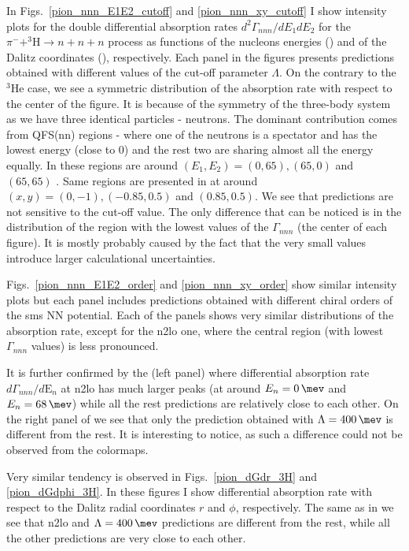     In Figs.~\ref{pion_nnn_E1E2_cutoff} and \ref{pion_nnn_xy_cutoff} I show intensity plots for the double differential absorption rates
    $d^2 \Gamma_{nnn}/dE_1dE_2$ for the $\pi^- + ^3\text{H} \rightarrow n + n + n$ process as functions of the nucleons energies
    () and of the Dalitz coordinates (), respectively.
    Each panel in the figures presents predictions obtained with different values of the cut-off parameter $\Lambda$.
    On the contrary to the $^3$He case, we see a symmetric distribution of the absorption rate with respect to the
    center of the figure. It is because of the symmetry of the three-body system as we have three identical particles - neutrons.
    The dominant contribution comes from QFS(nn) regions - where one of the neutrons is a spectator and has the lowest energy (close to 0)
    and the rest two are sharing almost all the energy equally.
    In  these regions are around $(E_1, E_2) = (0, 65), (65, 0)$ and $(65, 65)$ \SI{}{\mev}.
    Same regions are presented in  at around $(x, y) = (0, -1), (-0.85, 0.5)$ and $(0.85, 0.5)$.
    We see that predictions are not sensitive to the cut-off value.
    The only difference that can be noticed is in the distribution of the region with the lowest values of 
    the $\Gamma_{nnn}$ (the center of each figure). It is mostly probably caused by the fact that
    the very small values introduce larger calculational uncertainties.


    Figs.~\ref{pion_nnn_E1E2_order} and \ref{pion_nnn_xy_order} show similar intensity plots but each panel includes
    predictions obtained with different chiral orders of the \gls{sms} NN potential. Each of the panels
    shows very similar distributions of the absorption rate, except for the \gls{n2lo} one, where the central region (with lowest $\Gamma_{nnn}$ values) is less pronounced.

    It is further confirmed by the  (left panel) where differential absorption rate $d\Gamma_{nnn} /d\text{E}_n$ at \gls{n2lo} has much larger peaks (at around $E_n = \SI{0}{\mev}$ and $E_n = \SI{68}{\mev}$)
    while all the rest predictions are relatively close to each other.
    On the right panel of  we see that only the prediction obtained with $\Lambda=\SI{400}{\mev}$ is different from the rest. It is interesting to notice, as such a difference could not be observed from the colormaps.

    Very similar tendency is observed in Figs.~\ref{pion_dGdr_3H} and \ref{pion_dGdphi_3H}.
    In these figures I show differential absorption rate with respect to the Dalitz radial coordinates $r$ and $\phi$, respectively. The same as in  we see that \gls{n2lo} and $\Lambda = \SI{400}{\mev} $ predictions are different from the rest, while all the other predictions are very close to each other.


